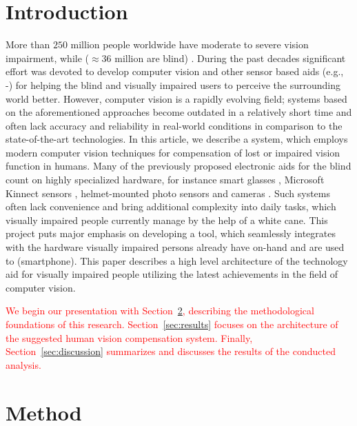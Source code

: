 \documentclass[10pt,conference,compsocconf]{IEEEtran}
\begin{document}
\section{Introduction}
\label{sec:introduction}
More than $250$ million people worldwide have moderate to severe vision impairment, while ($\approx 36$ million are blind) \cite{Bourne}. During the past decades significant effort was devoted to develop computer vision and other sensor based aids (e.g., \cite{Caraiman}-\cite{Zientara}) for helping the blind and visually impaired users to perceive the surrounding world better. However, computer vision is a rapidly evolving field; systems based on the aforementioned approaches become outdated in a relatively short time and often lack accuracy and reliability in real-world conditions in comparison to the state-of-the-art technologies. In this article, we describe a system, which employs modern computer vision techniques for compensation of lost or impaired vision function in humans. Many of the previously proposed electronic aids for the blind count on highly specialized hardware, for instance smart glasses \cite{Zientara}, Microsoft Kinnect sensors \cite{Owayjan}, helmet-mounted photo sensors and cameras \cite{Dunai}. Such systems often lack convenience and bring additional complexity into daily tasks, which visually impaired people currently manage by the help of a white cane. This project puts major emphasis on developing a tool, which seamlessly integrates with the hardware visually impaired persons already have on-hand and are used to (smartphone). This paper describes a high level architecture of the technology aid for visually impaired people utilizing the latest achievements in the field of computer vision. 

\textcolor{red}{We begin our presentation with Section~\ref{sec:method}, describing the methodological foundations of this research. Section~\ref{sec:results} focuses on the architecture of the suggested human vision compensation system. Finally, Section~\ref{sec:discussion} summarizes and discusses the results of the conducted analysis.}

\section{Method}
\label{sec:method}
\end{document}
